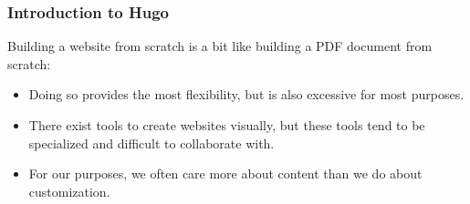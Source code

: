 \begin{frame}
    \frametitle{Introduction to Hugo}

    Building a website from scratch is a bit like building a PDF document from scratch:

    \bigskip

    \begin{itemize}[<+->]
        \setlength\itemsep{2em}
        \item Doing so provides the most flexibility, but is also excessive for most purposes.
        \item There exist tools to create websites visually, but these tools tend to be specialized and difficult to
              collaborate with.
        \item For our purposes, we often care more about content than we do about customization.
    \end{itemize}

    \bigskip
\end{frame}